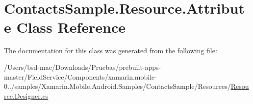 \hypertarget{class_contacts_sample_1_1_resource_1_1_attribute}{\section{Contacts\+Sample.\+Resource.\+Attribute Class Reference}
\label{class_contacts_sample_1_1_resource_1_1_attribute}
}


The documentation for this class was generated from the following file\+:\begin{DoxyCompactItemize}
\item 
/\+Users/bsd-\/mac/\+Downloads/\+Pruebas/prebuilt-\/apps-\/master/\+Field\+Service/\+Components/xamarin.\+mobile-\/0../samples/\+Xamarin.\+Mobile.\+Android.\+Samples/\+Contacts\+Sample/\+Resources/\hyperlink{_components_2xamarin_8mobile-0_86_81_2samples_2_xamarin_8_mobile_8_android_8_samples_2_contacts_d56de22a85d1f6d80155675d1a06eae3}{Resource.\+Designer.\+cs}\end{DoxyCompactItemize}
